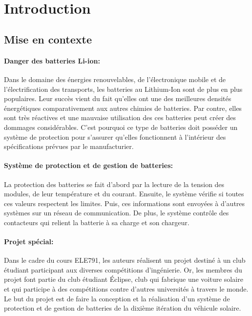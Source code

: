 \section{Introduction}

	\subsection{Mise en contexte}
		\paragraph*{Danger des batteries Li-ion:}
		Dans le domaine des énergies renouvelables, de l'électronique mobile et de l'électrification des transports, les batteries au Lithium-Ion sont de plus en plus populaires. Leur succès vient du fait qu'elles ont une des meilleures densités énergétiques comparativement aux autres chimies de batteries. Par contre, elles sont très réactives et une mauvaise utilisation des ces batteries peut créer des dommages considérables. C'est pourquoi ce type de batteries doit posséder un système de protection pour s'assurer qu'elles fonctionnent à l'intérieur des spécifications prévues par le manufacturier.

		\paragraph*{Système de protection et de gestion de batteries:}
		La protection des batteries se fait d'abord par la lecture de la tension des modules, de leur température et du courant. Ensuite, le système vérifie si toutes ces valeurs respectent les limites. Puis, ces informations sont envoyées à d'autres systèmes sur un réseau de communication. De plus, le système contrôle des contacteurs qui relient la batterie à sa charge et son chargeur.

		\paragraph*{Projet spécial:}
		Dans le cadre du cours ELE791, les auteurs réalisent un projet destiné à un club étudiant participant aux diverses compétitions d'ingénierie. Or, les membres du projet font partie du club étudiant Éclipse, club qui fabrique une voiture solaire et qui participe à des compétitions contre d'autres universités à travers le monde. Le but du projet est de faire la conception et la réalisation d'un système de protection et de gestion de batteries de la dixième itération du véhicule solaire.

